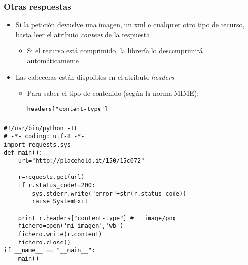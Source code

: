 \documentclass[ucs]{beamer}
\begin{document}
\begin{frame}[fragile]
\frametitle{Otras respuestas}
\begin{itemize}
\item
Si la petición devuelve una imagen, un xml o cualquier otro tipo
de recurso, basta leer el atributo \emph{content} de la respuesta

\begin{itemize}
\item
Si el recurso está comprimido, la librería lo descomprimirá automáticamente
\end{itemize}

\item
Las cabeceras están dispoibles en el atributo \emph{headers}

\begin{itemize}
\item
Para saber el tipo de contenido (según la norma MIME):
  \begin{footnotesize}
  \begin{verbatim}
headers["content-type"]
  \end{verbatim}
  \end{footnotesize}

\end{itemize}

\end{itemize}

\end{frame}



\begin{frame}[fragile]
\frametitle{}


  \begin{footnotesize}
  \begin{verbatim}
#!/usr/bin/python -tt
# -*- coding: utf-8 -*-
import requests,sys
def main():
    url="http://placehold.it/150/15c072"
    
    r=requests.get(url)
    if r.status_code!=200:
        sys.stderr.write("error"+str(r.status_code))
        raise SystemExit

    print r.headers["content-type"] #   image/png
    fichero=open('mi_imagen','wb')
    fichero.write(r.content)
    fichero.close()
if __name__ == "__main__":
    main()
  \end{verbatim}
  \end{footnotesize}



\end{frame}
\end{document}
